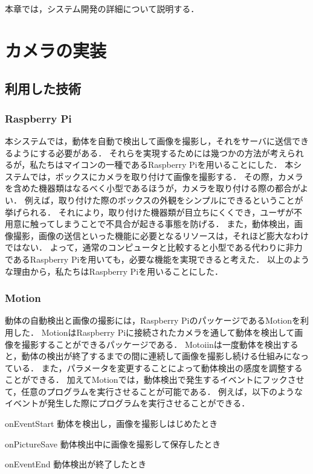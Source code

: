 \documentclass[../report]{subfiles}
\begin{document}
本章では，システム開発の詳細について説明する．


\section{カメラの実装}
\subsection{利用した技術} \label{sec:used-camera-technology}
\subsubsection{Raspberry Pi}
本システムでは，動体を自動で検出して画像を撮影し，それをサーバに送信できるようにする必要がある．
それらを実現するためには幾つかの方法が考えられるが，私たちはマイコンの一種であるRaspberry Piを用いることにした．
本システムでは，ボックスにカメラを取り付けて画像を撮影する．
その際，カメラを含めた機器類はなるべく小型であるほうが，カメラを取り付ける際の都合がよい．
例えば，取り付けた際のボックスの外観をシンプルにできるということが挙げられる．
それにより，取り付けた機器類が目立ちにくくでき，ユーザが不用意に触ってしまうことで不具合が起きる事態を防げる．
また，動体検出，画像撮影，画像の送信といった機能に必要となるリソースは，それほど膨大なわけではない．
よって，通常のコンピュータと比較すると小型である代わりに非力であるRaspberry Piを用いても，必要な機能を実現できると考えた．
以上のような理由から，私たちはRaspberry Piを用いることにした．

\subsubsection{Motion}
動体の自動検出と画像の撮影には，Raspberry PiのパッケージであるMotionを利用した．
MotionはRaspberry Piに接続されたカメラを通して動体を検出して画像を撮影することができるパッケージである．
Motoiinは一度動体を検出すると，動体の検出が終了するまでの間に連続して画像を撮影し続ける仕組みになっている．
また，パラメータを変更することによって動体検出の感度を調整することができる．
加えてMotionでは，動体検出で発生するイベントにフックさせて，任意のプログラムを実行させることが可能である．
例えば，以下のようなイベントが発生した際にプログラムを実行させることができる．
\begin{description}
    \item{onEventStart} 動体を検出し，画像を撮影しはじめたとき
    \item{onPictureSave} 動体検出中に画像を撮影して保存したとき
    \item{onEventEnd} 動体検出が終了したとき
\end{description}
\end{document}
